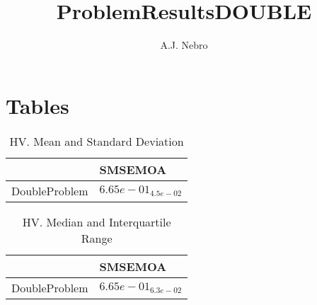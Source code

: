 \documentclass{article}
\title{ProblemResultsDOUBLE}
\author{A.J. Nebro}
\begin{document}
\maketitle
\section{Tables}

\begin{table}
\caption{HV. Mean and Standard Deviation}
\label{table: HV}
\centering
\begin{scriptsize}
\begin{tabular}{ll}
\hline &  SMSEMOA\\
\hline 
DoubleProblem & \cellcolor{gray95}$  6.65e-01_{ 4.5e-02}$ \\
\hline
\end{tabular}
\end{scriptsize}
\end{table}

\begin{table}
\caption{HV. Median and Interquartile Range}
\label{table: HV}
\centering
\begin{scriptsize}
\begin{tabular}{ll}
\hline &  SMSEMOA\\
\hline 
DoubleProblem & \cellcolor{gray95}$  6.65e-01_{ 6.3e-02}$ \\
\hline
\end{tabular}
\end{scriptsize}
\end{table}
\end{document}
